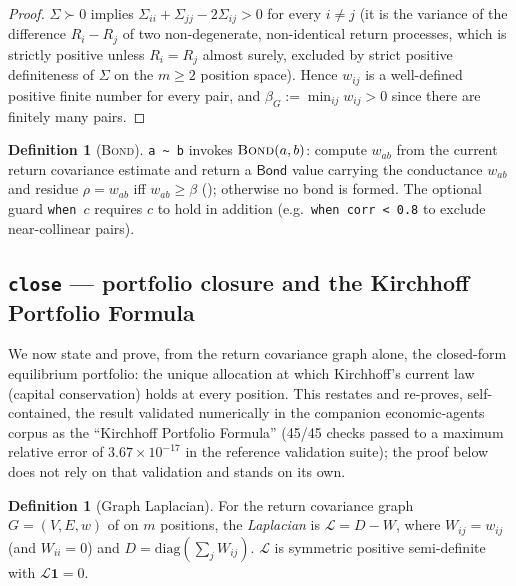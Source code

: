 \documentclass[11pt,a4paper]{article}
\theoremstyle{thmstyle}
\theoremstyle{definition}
\newtheorem{definition}[theorem]{Definition}
\theoremstyle{remark}
\newcommand{\V}{V}
\newcommand{\E}{E}
\newcommand{\wt}{w}
\newcommand{\flo}{\beta}
\newcommand{\res}{\rho}
\newcommand{\sh}[1]{\texttt{#1}}
\newcommand{\Lap}{\mathcal{L}}
\begin{document}
\begin{proof}
$\Sigma\succ0$ implies $\Sigma_{ii}+\Sigma_{jj}-2\Sigma_{ij}>0$ for every
$i\neq j$ (it is the variance of the difference $R_i-R_j$ of two
non-degenerate, non-identical return processes, which is strictly
positive unless $R_i=R_j$ almost surely, excluded by strict positive
definiteness of $\Sigma$ on the $m\ge2$ position space). Hence
$\wt_{ij}$ is a well-defined positive finite number for every pair, and
$\flo_G:=\min_{ij}\wt_{ij}>0$ since there are finitely many pairs.
\end{proof}

\begin{definition}[\textsc{Bond}]
\label{def:bond-op}
\sh{a\ \~{}\ b} invokes $\textsc{Bond}(a,b)$: compute $\wt_{ab}$ from the
current return covariance estimate and return a $\mathsf{Bond}$ value
carrying the conductance $\wt_{ab}$ and residue $\res=\wt_{ab}$ iff
$\wt_{ab}\ge\flo$ (); otherwise no bond is
formed. The optional guard \sh{when\ }$c$ requires $c$ to hold in
addition (e.g.\ \sh{when\ corr\ <\ 0.8} to exclude near-collinear
pairs).
\end{definition}

\subsection{\texorpdfstring{\sh{close} --- portfolio closure and the Kirchhoff Portfolio Formula}{close --- portfolio closure}}
\label{sec:stdlib-portfolio}

We now state and prove, from the return covariance graph alone, the
closed-form equilibrium portfolio: the unique allocation at which
Kirchhoff's current law (capital conservation) holds at every position.
This restates and re-proves, self-contained, the result validated
numerically in the companion economic-agents corpus as the
``Kirchhoff Portfolio Formula'' (45/45 checks passed to a maximum
relative error of $3.67\times10^{-17}$ in the reference validation
suite); the proof below does not rely on that validation and stands on
its own.

\begin{definition}[Graph Laplacian]
\label{def:laplacian}
For the return covariance graph $G=(\V,\E,\wt)$ of 
on $m$ positions, the \emph{Laplacian} is $\Lap=D-W$, where
$W_{ij}=\wt_{ij}$ (and $W_{ii}=0$) and $D=\mathrm{diag}(\sum_j W_{ij})$.
$\Lap$ is symmetric positive semi-definite with $\Lap\mathbf{1}=0$.
\end{definition}
\end{document}
